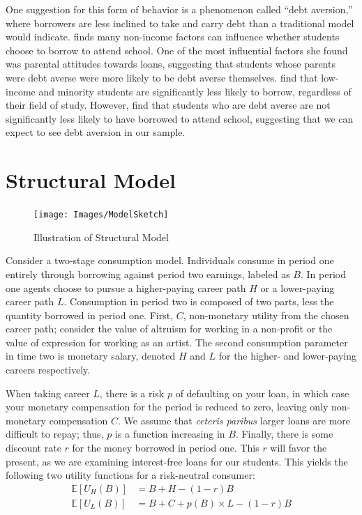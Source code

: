 \documentclass{article}
\begin{document}
	One suggestion for this form of behavior is a phenomenon called ``debt aversion,'' where borrowers are less inclined to take and carry debt than a traditional model would indicate. \textcite{burdman2005} finds many non-income factors can influence whether students choose to borrow to attend school. One of the most influential factors she found was parental attitudes towards loans, suggesting that students whose parents were debt averse were more likely to be debt averse themselves. \textcite{callender2005} find that low-income and minority students are significantly less likely to borrow, regardless of their field of study. However, \textcite{eckel2007} find that students who are debt averse are not significantly less likely to have borrowed to attend school, suggesting that we can expect to see debt aversion in our sample. 

	\section{Structural Model}
	
	\begin{figure}
		\centering
		\caption{Illustration of Structural Model}
		\label{struc}
		\texttt{[image: Images/ModelSketch]}
	\end{figure}

	Consider a two-stage consumption model. Individuals consume in period one entirely through borrowing against period two earnings, labeled as $B$. In period one agents choose to pursue a higher-paying career path $H$ or a lower-paying career path $L$. Consumption in period two is composed of two parts, less the quantity borrowed in period one. First, $C$, non-monetary utility from the chosen career path; consider the value of altruism for working in a non-profit or the value of expression for working as an artist. The second consumption parameter in time two is monetary salary, denoted $H$ and $L$ for the higher- and lower-paying careers respectively.
	
	When taking career $L$, there is a risk $p$ of defaulting on your loan, in which case your monetary compensation for the period is reduced to zero, leaving only non-monetary compensation $C$. We assume that \emph{ceteris paribus} larger loans are more difficult to repay; thus, $p$ is a function increasing in $B$. Finally, there is some discount rate $r$ for the money borrowed in period one. This $r$ will favor the present, as we are examining interest-free loans for our students. This yields the following two utility functions for a risk-neutral consumer: 
	\begin{align}
	\mathbb{E}\left[U_H(B)\right] &= B + H - (1 - r)B \label{highu}\\
	\mathbb{E}\left[U_L(B)\right] &= B + C + p(B) \times L - (1 - r)B \label{lowu}
	\end{align}
	
\end{document}
